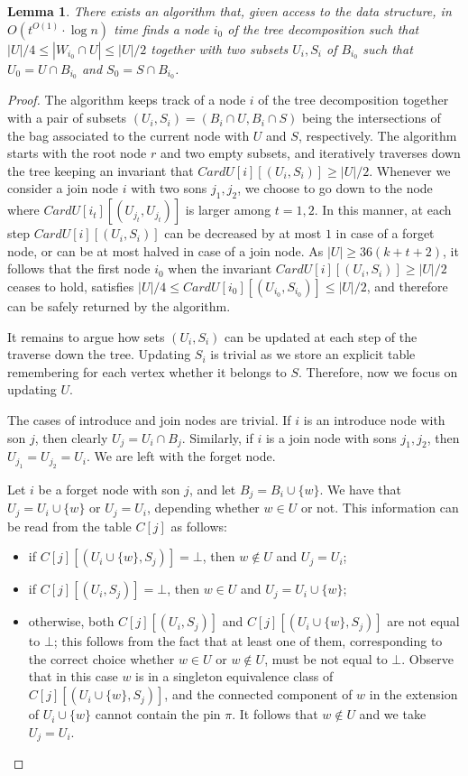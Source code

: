 \documentclass[a4paper,11pt]{article}
\newtheorem{lemma}{Lemma}[section]
\theoremstyle{definition}
\theoremstyle{remark}
\newcommand{\pin}{\pi}
\begin{document}
\begin{lemma}\label{lem:tracing}
  There exists an algorithm that, given access to the data structure,
  in $O(t^{O(1)}\cdot \log n)$ time finds a node $i_0$ of the tree
  decomposition such that $|U|/4 \leq |W_{i_0}\cap U|\leq |U|/2$
  together with two subsets $U_i,S_i$ of $B_{i_0}$ such that $U_0=U\cap
  B_{i_0}$ and $S_0=S\cap B_{i_0}$.
\end{lemma}
\begin{proof}
  The algorithm keeps track of a node $i$ of the tree decomposition
  together with a pair of subsets $(U_i,S_i)=(B_i\cap U,B_i\cap S)$
  being the intersections of the bag associated to the current node
  with $U$ and $S$, respectively.  The algorithm starts with the root
  node $r$ and two empty subsets, and iteratively traverses down the
  tree keeping an invariant that $CardU[i][(U_i,S_i)]\geq |U|/2$.
  Whenever we consider a join node $i$ with two sons $j_1,j_2$, we
  choose to go down to the node where $CardU[i_t][(U_{j_t},U_{j_t})]$
  is larger among $t=1,2$.  In this manner, at each step
  $CardU[i][(U_i,S_i)]$ can be decreased by at most $1$ in case of a
  forget node, or can be at most halved in case of a join node.  As
  $|U|\geq 36(k+t+2)$, it follows that the first node $i_0$ when the
  invariant $CardU[i][(U_i,S_i)]\geq |U|/2$ ceases to hold, satisfies
  $|U|/4 \leq CardU[i_0][(U_{i_0},S_{i_0})]\leq |U|/2$, and therefore
  can be safely returned by the algorithm.
  
  It remains to argue how sets $(U_i,S_i)$ can be updated at each step
  of the traverse down the tree.  Updating $S_i$ is trivial as we
  store an explicit table remembering for each vertex whether it
  belongs to $S$.  Therefore, now we focus on updating $U$.
  
  The cases of introduce and join nodes are trivial.  If $i$ is an
  introduce node with son $j$, then clearly $U_j=U_i\cap B_j$.
  Similarly, if $i$ is a join node with sons $j_1,j_2$, then
  $U_{j_1}=U_{j_2}=U_i$.  We are left with the forget node.
  
  Let $i$ be a forget node with son $j$, and let $B_j=B_i\cup \{w\}$.  We
  have that $U_j=U_i\cup \{w\}$ or $U_j=U_i$, depending whether $w\in
  U$ or not.  This information can be read from the table $C[j]$ as
  follows:
  \begin{itemize}
  \item if $C[j][(U_i\cup \{w\},S_j)]=\bot$, then $w\notin U$ and $U_j=U_i$;
  \item if $C[j][(U_i,S_j)]=\bot$, then $w\in U$ and $U_j=U_i\cup \{w\}$;
  \item otherwise, both $C[j][(U_i,S_j)]$ and $C[j][(U_i\cup \{w\},S_j)]$
    are not equal to $\bot$; this follows from the fact that at least
    one of them, corresponding to the correct choice whether $w\in U$
    or $w\notin U$, must be not equal to $\bot$.  Observe that in this
    case $w$ is in a singleton equivalence class of $C[j][(U_i\cup
    \{w\},S_j)]$, and the connected component of $w$ in the extension
    of $U_i\cup \{w\}$ cannot contain the pin $\pin$.  It follows that
    $w\notin U$ and we take $U_j=U_i$.
  \end{itemize}
  

\end{proof}
\end{document}
